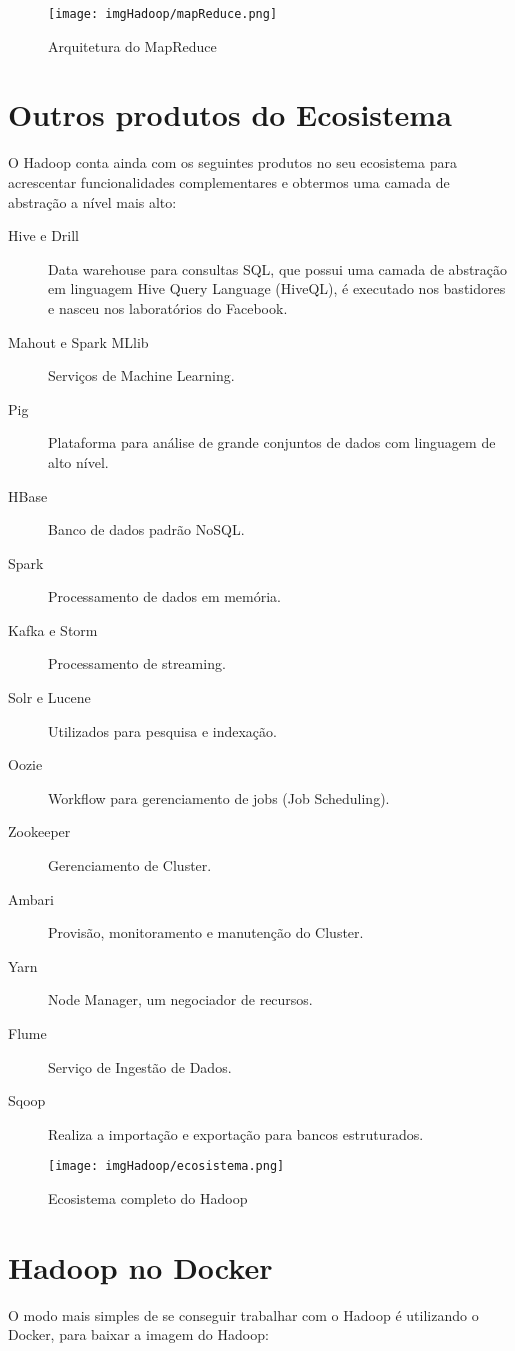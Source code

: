 \documentclass[a4paper,11pt]{article}
\begin{document}
\begin{figure}[H]
	\centering
	\texttt{[image: imgHadoop/mapReduce.png]}
	\caption{Arquitetura do MapReduce}
\end{figure}

\section{Outros produtos do Ecosistema}
O Hadoop conta ainda com os seguintes produtos no seu ecosistema para acrescentar funcionalidades complementares e obtermos uma camada de abstração a nível mais alto: \vspace{-1em}
\begin{description}
	\item[Hive e Drill] Data warehouse para consultas SQL, que possui uma camada de abstração em linguagem Hive Query Language (HiveQL), é executado nos bastidores e nasceu nos laboratórios do Facebook.
	\item[Mahout e Spark MLlib] Serviços de Machine Learning.
	\item[Pig] Plataforma para análise de grande conjuntos de dados com linguagem de alto nível.
	\item[HBase] Banco de dados padrão NoSQL.
	\item[Spark] Processamento de dados em memória.
	\item[Kafka e Storm] Processamento de streaming.
	\item[Solr e Lucene] Utilizados para pesquisa e indexação.
	\item[Oozie] Workflow para gerenciamento de jobs (Job Scheduling).
	\item[Zookeeper] Gerenciamento de Cluster.
	\item[Ambari] Provisão, monitoramento e manutenção do Cluster.
	\item[Yarn] Node Manager, um negociador de recursos.
	\item[Flume] Serviço de Ingestão de Dados.
	\item[Sqoop] Realiza a importação e exportação para bancos estruturados.
\end{description}

\begin{figure}[H]
	\centering
	\texttt{[image: imgHadoop/ecosistema.png]}
	\caption{Ecosistema completo do Hadoop}
\end{figure}

\section{Hadoop no Docker}
O modo mais simples de se conseguir trabalhar com o Hadoop é utilizando o Docker, para baixar a imagem do Hadoop: \\
\end{document}
